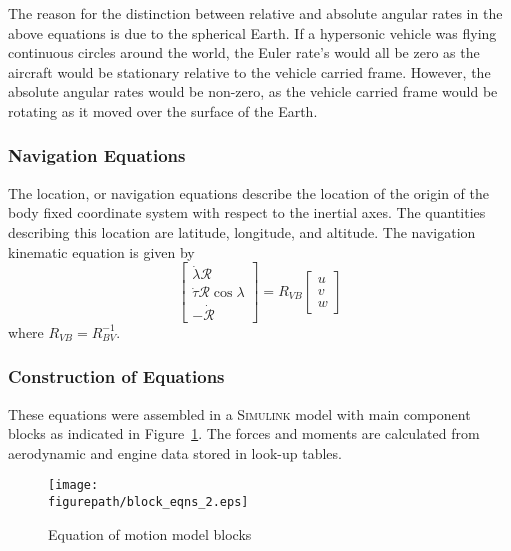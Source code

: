 The reason for the distinction between relative and absolute angular rates in the above equations is due to the spherical Earth.
If a hypersonic vehicle was flying continuous circles around the world, the Euler rate's would all be zero as the aircraft would be stationary relative to the vehicle carried frame.
However, the absolute angular rates would be non-zero, as the vehicle carried frame would be rotating as it moved over the surface of the Earth.

\subsubsection*{Navigation Equations}

The location, or navigation equations describe the location of the origin of the body fixed coordinate system with respect to the inertial axes.
The quantities describing this location are latitude, longitude, and altitude.
The navigation kinematic equation is given by
\begin{equation}
  \begin{bmatrix}
    \dot{\lambda}\mathscr{R} \\
    \dot{\tau}\mathscr{R}\cos{\lambda} \\
    -\dot{\mathscr{R}}
  \end{bmatrix}=R_{VB}
  \begin{bmatrix}
    u \\
    v \\
    w
  \end{bmatrix}
\end{equation}
where $R_{VB}=R_{BV}^{-1}$.

\subsubsection*{Construction of Equations}

These equations were assembled in a \textsc{Simulink} model with main component blocks as indicated in Figure~\ref{fig.ghvblocks}.
The forces and moments are calculated from aerodynamic and engine data stored in look-up tables.

\begin{figure}[H]
  \begin{center}
    \texttt{[image: \\figurepath/block\_eqns\_2.eps]}
    \caption{Equation of motion model blocks\ \cite{etkin.atmosphericflight.1972}\label{fig.ghvblocks}}
  \end{center}
\end{figure}

